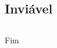 \documentclass{beamer}
\begin{document}
\subsection{Inviável}

\subsection{ } 
	
\begin{frame}
\Huge{\centerline{Fim}}
\end{frame}

\end{document}
